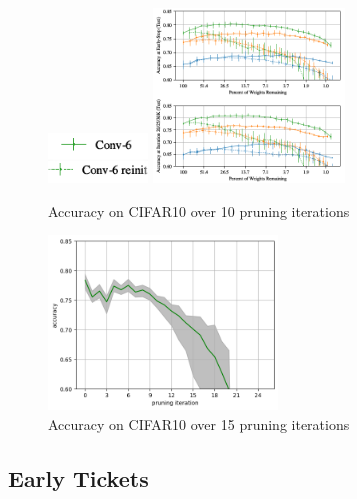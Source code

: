 \begin{figure}
	\begin{minipage}{\textwidth}
		\centering
		\includegraphics[width=100px]{gfx/7-Evaluation/LTH_4_legend.png}
	\end{minipage}
	\begin{minipage}{0.5\textwidth}
		\centering
		\includegraphics[height=175px]{gfx/7-Evaluation/LTH_CNN.png}
		\caption*{Accuracy on CIFAR10 over 10 pruning iterations}
		\label{?}
	\end{minipage}\hfill
	\begin{minipage}{0.5\textwidth}
		\centering
		\includegraphics[height=175px]{gfx/Experiments/Reproduction-CIFAR10-CNN/accuracy/LTH.png}
		\caption*{Accuracy on CIFAR10 over 15 pruning iterations}
		\label{?}
	\end{minipage}
\end{figure}
\subsection*{Early Tickets}
